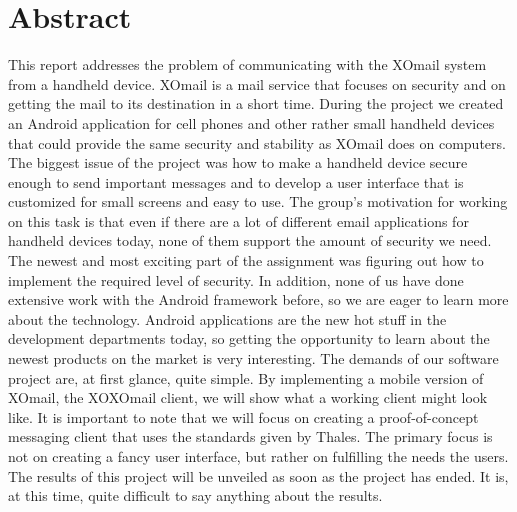 
\chapter*{Abstract}

This report addresses the problem of communicating with the XOmail system from a handheld device. XOmail is a mail service that focuses on security and on getting the mail to its destination in a short time. During the project we created an Android application for cell phones and other rather small handheld devices that could provide the same security and stability as XOmail does on computers. The biggest issue of the project was how to make a handheld device secure enough to send important messages and to develop a user interface that is customized for small screens and easy to use. 
\newline
\newline
The group’s motivation for working on this task is that even if there are a lot of different email applications for handheld devices today, none of them support the amount of security we need. The newest and most exciting part of the assignment was figuring out how to implement the required level of security. In addition, none of us have done extensive work with the Android framework before, so we are eager to learn more about the technology. Android applications are the new hot stuff in the development departments today, so getting the opportunity to learn about the newest products on the market is very interesting. 
\newline
\newline
The demands of our software project are, at first glance, quite simple. By implementing a mobile version of XOmail, the XOXOmail client, we will show what a working client might look like. It is important to note that we will focus on creating a proof-of-concept messaging client that uses the standards given by Thales. The primary focus is not on creating a fancy user interface, but rather on fulfilling the needs the users. 
\newline
\newline
The results of this project will be unveiled as soon as the project has ended. It is, at this time, quite difficult to say anything about the results.

